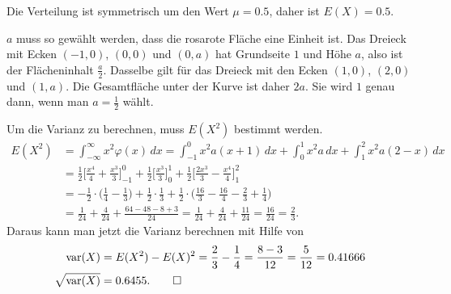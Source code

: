 \begin{loesung}
\begin{teilaufgaben}
\item Die Verteilung ist symmetrisch um den Wert $\mu=0.5$,
daher ist $E(X)=0.5$.
\item $a$ muss so gewählt werden, dass die rosarote Fläche eine Einheit ist.
Das Dreieck mit Ecken $(-1,0)$, $(0,0)$ und $(0,a)$ hat Grundseite $1$ und
Höhe $a$, also ist der Flächeninhalt $\frac{a}2$.
Dasselbe gilt für das Dreieck mit den Ecken $(1,0)$, $(2,0)$ und $(1,a)$.
Die Gesamtfläche unter der Kurve ist daher $2a$.
Sie wird $1$ genau dann, wenn man $a=\frac12$ wählt.
\item
Um die Varianz zu berechnen, muss $E(X^2)$ bestimmt werden.
\begin{align*}
E(X^2)
&=
\int_{-\infty}^\infty x^2 \varphi(x)\,dx
=
\int_{-1}^0 x^2 a(x+1)\,dx
+
\int_0^1 x^2a\,dx
+
\int_1^2 x^2a(2-x)\,dx
\\
&=
\frac12\biggl[
\frac{x^4}4+\frac{x^3}3
\biggr]_{-1}^0
+
\frac12\biggl[
\frac{x^3}3
\biggr]_{0}^1
+
\frac12\biggl[
\frac{2x^3}3
-
\frac{x^4}4
\biggr]_{1}^2
\\
&=
-\frac12\cdot\biggl(\frac14-\frac13\biggr)
+
\frac12\cdot\frac13
+
\frac12\cdot\biggl(\frac{16}3-\frac{16}4-\frac23+\frac14\biggr)
\\
&=
\frac1{24}
+\frac4{24}
+\frac{64-48-8+3}{24}
=
\frac1{24}
+\frac4{24}
+\frac{11}{24}
=
\frac{16}{24}
=
\frac{2}{3}.
\end{align*}
Daraus kann man jetzt die Varianz berechnen mit Hilfe von
\begin{align*}
\operatorname{var}(X)
&=
E(X^2) - E(X)^2
=
\frac{2}{3} - \frac{1}{4}
=
\frac{8-3}{12}=\frac{5}{12}=0.41666
\\
\sqrt{\operatorname{var}(X)}
&=
0.6455.
\qedhere
\end{align*}
\end{teilaufgaben}
\end{loesung}
